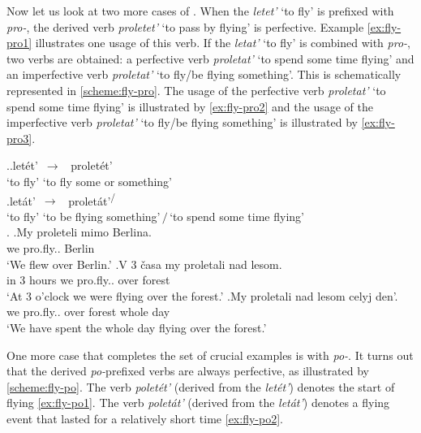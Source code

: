 Now let us look at two more cases of . When the  \textit{letet'}\textsuperscript{\IPF} `to fly' is prefixed with \textit{pro-}, the derived verb \textit{proletet'}\textsuperscript{\PF} `to pass by flying' is perfective. Example \ref{ex:fly-pro1} illustrates one usage of this verb. If the  \textit{letat'}\textsuperscript{\IPF} `to fly' is combined with \textit{pro-}, two verbs are obtained: a perfective verb \textit{proletat'}\textsuperscript{\PF} `to spend some time flying' and an imperfective verb \textit{proletat'}\textsuperscript{\IPF} `to fly/be flying  something'.  This is schematically represented in \ref{scheme:fly-pro}. The usage of the perfective verb \textit{proletat'}\textsuperscript{\PF} `to spend some time flying' is illustrated by \ref{ex:fly-pro2} and the usage of the imperfective verb \textit{proletat'}\textsuperscript{\IPF} `to fly/be flying  something' is illustrated by \ref{ex:fly-pro3}. 

\ex.\label{scheme:fly-pro}\ag.let\'{e}t'\textsuperscript{\IPF}~$\to$~ prolet\'{e}t'\textsuperscript{\PF}\\
{`to fly'} {`to fly some  or  something'}\\
\bg.let\'{a}t'\textsuperscript{\IPF}~$\to$~ prolet\'{a}t'\textsuperscript{\IPF\slash\PF}\\
{`to fly'} {`to be flying  something'\,$/$\,`to spend some time flying'}\\

\ex.\label{ex:fly-pro}
\ag.\label{ex:fly-pro1}My proleteli\textsuperscript{\PF} mimo Berlina.\\
we pro.fly..  Berlin\\
\trans `We flew over Berlin.'
\bg.\label{ex:fly-pro2}V 3 \v{c}asa my proletali\textsuperscript{\IPF} nad lesom.\\
in 3 hours we pro.fly.. over forest\\
\trans `At 3 o'clock we were flying over the forest.'
\bg.\label{ex:fly-pro3}My proletali\textsuperscript{\PF} nad lesom celyj den'.\\
we pro.fly.. over forest whole day\\
\trans `We have spent the whole day flying over the forest.'

One more case that completes the set of crucial examples is  with \textit{po-}. It turns out that the derived \textit{po-}prefixed verbs are always perfective, as illustrated by \ref{scheme:fly-po}. The verb \textit{polet\'{e}t'\textsuperscript{\PF}} (derived from the  \textit{let\'{e}t'\textsuperscript{\IPF}}) denotes the start of flying \ref{ex:fly-po1}. The verb \textit{polet\'{a}t'\textsuperscript{\PF}} (derived from the  \textit{let\'{a}t'\textsuperscript{\IPF}}) denotes a flying event that lasted for a relatively short time \ref{ex:fly-po2}.

